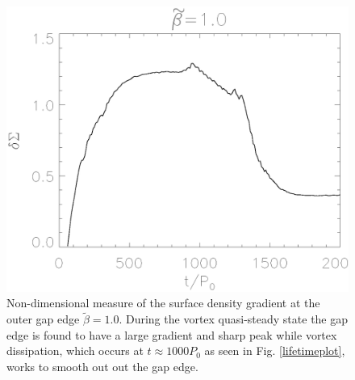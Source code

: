 \begin{figure}
  \includegraphics[width=\linewidth]{figures/gap_smoothness}
  \caption{Non-dimensional measure of the surface density gradient at
    the outer gap edge $\tilde\beta=1.0$. During the vortex quasi-steady state
    the gap edge is found to have a large gradient and sharp peak while vortex
    dissipation,
    which occurs at $t\approx1000P_0$ as seen in Fig. \ref{lifetimeplot},
    works to smooth out out the gap edge.
    \label{smoothnessplot}}  
\end{figure}




